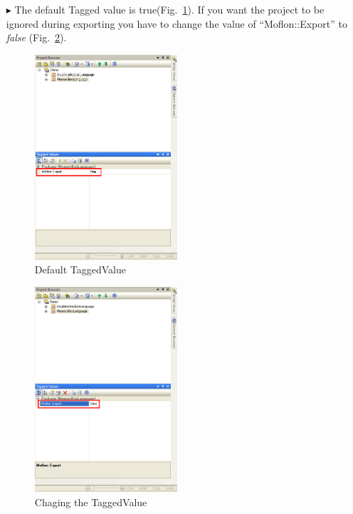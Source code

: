 \begin{enumerate}

\item[$\blacktriangleright$]The default Tagged value is
true(Fig.~\ref{fig_ignoreExportingProject02}). If you want the project to be 
ignored during exporting you have to change the value of ``Moflon::Export'' to
\emph{false} (Fig.~\ref{fig_ignoreExportingProject03}).

\begin{figure}[htbp]
\begin{center}
  \includegraphics[width=0.5\textwidth]{pics/tricks/ignoreExportingProject/ignoreExportingProject2}
  \caption{Default TaggedValue}  
  \label{fig_ignoreExportingProject02}
\end{center}
\end{figure}



\begin{figure}[htbp]
\begin{center}
  \includegraphics[width=0.5\textwidth]{pics/tricks/ignoreExportingProject/ignoreExportingProject3}
  \caption{Chaging the TaggedValue}  
  \label{fig_ignoreExportingProject03}
\end{center}
\end{figure}

\end{enumerate}


